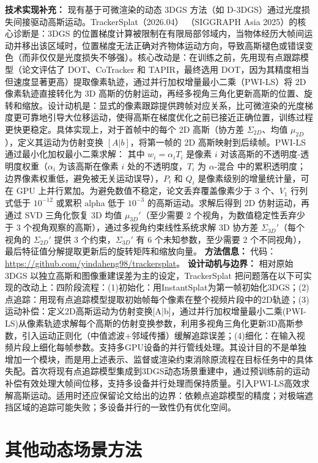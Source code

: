 \textbf{技术实现补充：} 现有基于可微渲染的动态 3DGS 方法（如 D-3DGS）通过光度损失间接驱动高斯运动。TrackerSplat（2026.04） （SIGGRAPH Asia 2025）的核心诊断是：3DGS 的位置梯度计算被限制在有限局部邻域内，当物体经历大帧间运动并移出该区域时，位置梯度无法正确对齐物体运动方向，导致高斯褪色或错误变色（而非仅仅是光度损失不够强）。核心改动是：在训练之前，先用现有点跟踪模型（论文评估了 DOT、CoTracker 和 TAPIR，最终选用 DOT，因为其精度相当但速度显著更高）提取像素轨迹，通过并行加权增量最小二乘（PWI-LS）将 2D 像素轨迹直接转化为 3D 高斯的仿射运动，再经多视角三角化更新高斯的位置、旋转和缩放。设计动机是：显式的像素跟踪提供跨帧对应关系，比可微渲染的光度梯度更可靠地引导大位移运动，使得高斯在梯度优化之前已接近正确位置，训练过程更快更稳定。具体实现上，对于首帧中的每个 2D 高斯（协方差 $\Sigma_{2D}$、均值 $\mu_{2D}$），定义其运动为仿射变换 $[A|b]$，将第一帧的 2D 高斯映射到后续帧。PWI-LS 通过最小化加权最小二乘求解： 其中 $w_i = \alpha_i T_i$ 是像素 $i$ 对该高斯的不透明度-透明度权重（$\alpha_i$ 为该高斯在像素 $i$ 处的不透明度，$T_i$ 为 $\alpha$-混合 中的累积透明度；边界像素权重低，避免被无关运动误导），$P_i$ 和 $Q_i$ 是像素级别的增量统计量，可在 GPU 上并行累加。为避免数值不稳定，论文丢弃覆盖像素少于 3 个、$V_1$ 行列式低于 $10^{-12}$ 或累积 alpha 低于 $10^{-3}$ 的高斯运动。求解后得到 2D 仿射运动，再通过 SVD 三角化恢复 3D 均值 $\mu_{3D}'$（至少需要 2 个视角，为数值稳定性丢弃少于 3 个视角观察的高斯），通过多视角约束线性系统求解 3D 协方差 $\Sigma_{3D}'$（每个视角的 $\Sigma_{2D}'$ 提供 3 个约束，$\Sigma_{3D}'$ 有 6 个未知参数，至少需要 2 个不同视角），最后特征值分解提取更新后的旋转矩阵和缩放向量。
\textbf{方法信息：} 代码：\url{https://github.com/yindaheng98/trackersplat}。
\textbf{设计动机与边界：} 相对原始 3DGS 以独立高斯和图像重建误差为主的设定，TrackerSplat 把问题落在以下可实现的改动上：四阶段流程：(1)初始化：用InstantSplat为第一帧初始化3DGS；(2)点追踪：用现有点追踪模型提取初始帧每个像素在整个视频片段中的2D轨迹；(3)运动补偿：定义2D高斯运动为仿射变换[A|b]，通过并行加权增量最小二乘(PWI-LS)从像素轨迹求解每个高斯的仿射变换参数，利用多视角三角化更新3D高斯参数，引入运动正则化（中值滤波+邻域传播）缓解追踪误差；(4)细化：在输入视频片段上细化每帧参数。支持多GPU设备的并行管线处理。其设计目的不是单独增加一个模块，而是用上述表示、监督或渲染约束消除原流程在目标任务中的具体失配。首次将现有点追踪模型集成到3DGS动态场景重建中，通过预训练前的运动补偿有效处理大帧间位移，支持多设备并行处理而保持质量。引入PWI-LS高效求解高斯运动。适用时还应保留论文给出的边界：依赖点追踪模型的精度；对极端遮挡区域的追踪可能失败；多设备并行的一致性仍有优化空间。

\section{其他动态场景方法}

